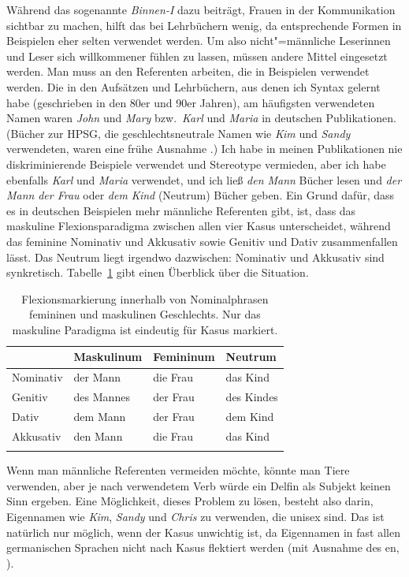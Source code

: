 Während das sogenannte \emph{Binnen-I} dazu beiträgt, Frauen in der Kommunikation sichtbar zu machen,
hilft das bei Lehrbüchern wenig, da entsprechende Formen in Beispielen eher selten verwendet werden.
Um also nicht"=männliche Leserinnen und Leser sich willkommener fühlen zu lassen, müssen andere
Mittel eingesetzt werden. Man muss an den Referenten arbeiten, die in Beispielen verwendet werden.
Die in den Aufsätzen und Lehrbüchern, aus denen ich Syntax gelernt habe (geschrieben in den 80er und
90er Jahren), am häufigsten verwendeten Namen waren \emph{John} und \emph{Mary} bzw.\ \emph{Karl} und
\emph{Maria} in deutschen Publikationen. (Bücher zur HPSG, die geschlechtsneutrale Namen wie
\emph{Kim} und \emph{Sandy} verwendeten, waren eine frühe Ausnahme \citep{ps,ps2}.) Ich habe in
meinen Publikationen nie diskriminierende Beispiele verwendet und Stereotype vermieden, aber ich habe
ebenfalls \emph{Karl} und \emph{Maria} verwendet, und ich ließ \emph{den Mann} Bücher lesen und
\emph{der Mann} \emph{der Frau} oder \emph{dem Kind} (Neutrum) Bücher geben. Ein Grund dafür, dass es
in deutschen Beispielen mehr männliche Referenten gibt, ist, dass das maskuline
Flexionsparadigma zwischen allen vier Kasus unterscheidet, während das feminine Nominativ und
Akkusativ sowie Genitiv und Dativ zusammenfallen lässt. Das Neutrum liegt irgendwo dazwischen:
Nominativ und Akkusativ sind synkretisch. Tabelle~\ref{table-German-case-syncretism} gibt einen
Überblick über die Situation.
\begin{table}
\begin{tabular}{llll}\lsptoprule
           & Maskulinum & Femininum & Neutrum\\\midrule
Nominativ  & der Mann   & die Frau  & das Kind\\
Genitiv    & des Mannes & der Frau  & des Kindes\\
Dativ      & dem Mann   & der Frau  & dem Kind\\
Akkusativ  & den Mann   & die Frau  & das Kind\\
\lspbottomrule
\end{tabular}
\caption{\label{table-German-case-syncretism}Flexionsmarkierung innerhalb von Nominalphrasen femininen und maskulinen Geschlechts. Nur das maskuline
  Paradigma ist eindeutig für Kasus markiert.}
\end{table}  
Wenn man männliche Referenten vermeiden möchte, könnte man Tiere verwenden, aber je nach verwendetem
Verb würde ein Delfin als Subjekt keinen Sinn ergeben. Eine Möglichkeit, dieses Problem zu lösen,
besteht also darin, Eigennamen wie \emph{Kim}, \emph{Sandy} und \emph{Chris} zu verwenden, die unisex
sind. Das ist natürlich nur möglich, wenn der Kasus unwichtig ist, da Eigennamen in fast allen
germanischen Sprachen nicht nach Kasus flektiert werden (mit Ausnahme des en,
\citealp[]{ZMT85a}).

